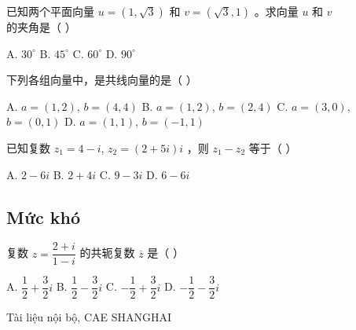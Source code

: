 \documentclass[11pt, a4paper]{article}
\begin{document}
\begin{baitap}[7]
已知两个平面向量 $u = (1, \sqrt{3})$ 和 $v = (\sqrt{3}, 1)$ 。求向量 $u$ 和 $v$ 的夹角是（ ）
\par\vspace{3pt}
\noindent A. $30^\circ$ \quad B. $45^\circ$ \quad C. $60^\circ$ \quad D. $90^\circ$
\end{baitap}
\begin{baitap}[8]
下列各组向量中，是共线向量的是（ ）
\par\vspace{3pt}
\noindent A. $a = (1,2)$, $b = (4,4)$ \quad B. $a = (1,2)$, $b = (2,4)$ \quad C. $a = (3,0)$, $b = (0,1)$ \quad D. $a = (1,1)$, $b = (-1,1)$
\end{baitap}
\begin{baitap}[9]
已知复数 $z_1 = 4 - i$, $z_2 = (2 + 5i)i$ ，则 $z_1 - z_2$ 等于（ ）
\par\vspace{3pt}
\noindent A. $2 - 6i$ \quad B. $2 + 4i$ \quad C. $9 - 3i$ \quad D. $6 - 6i$
\end{baitap}
\subsection{Mức khó}

\begin{baitap}[10]
复数 $z = \dfrac{2+i}{1-i}$ 的共轭复数 $\overline{z}$ 是（ ）
\par\vspace{3pt}
\noindent A. $\dfrac{1}{2} + \dfrac{3}{2}i$ \quad B. $\dfrac{1}{2} - \dfrac{3}{2}i$ \quad C. $-\dfrac{1}{2} + \dfrac{3}{2}i$ \quad D. $-\dfrac{1}{2} - \dfrac{3}{2}i$
\end{baitap}
\vspace{0.8cm}
\begin{center}
{\footnotesize\color{cae_blue} Tài liệu nội bộ, CAE SHANGHAI}
\end{center}
\end{document}
